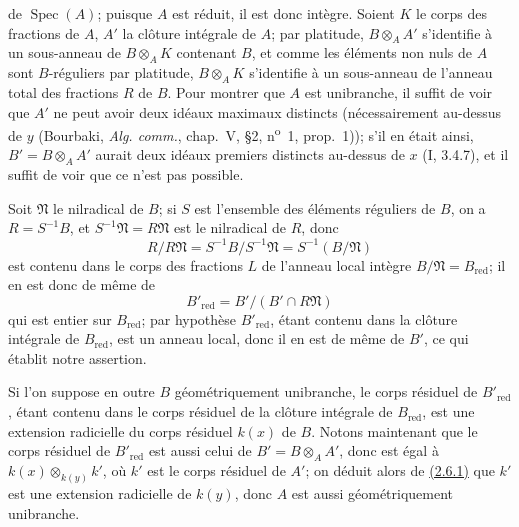 de $\operatorname{Spec}(A)$; puisque $A$ est réduit, il est donc
intègre. Soient $K$ le corps des fractions de $A$, $A'$ la clôture
intégrale de $A$; par platitude, $B\otimes_AA'$ s'identifie à un
sous-anneau de $B\otimes_AK$ contenant $B$, et comme les éléments non
nuls de $A$ sont $B$-réguliers par platitude, $B\otimes_AK$ s'identifie
à un sous-anneau de l'anneau total des fractions $R$ de $B$. Pour
montrer que $A$ est unibranche, il suffit de voir que $A'$ ne peut avoir
deux idéaux maximaux distincts (nécessairement au-dessus de $y$
(Bourbaki, \emph{Alg. comm.}, chap.~V, \S2,
n\textsuperscript{o}~1, prop.~1)); s'il en était ainsi,
$B'=B\otimes_AA'$ aurait deux idéaux premiers distincts au-dessus de
$x$ (I, 3.4.7), et il suffit de voir que ce n'est pas possible.

Soit $\mathfrak N$ le nilradical de $B$; si $S$ est l'ensemble des
éléments réguliers de $B$, on a $R=S^{-1}B$, et
$S^{-1}\mathfrak N=R\mathfrak N$ est le nilradical de $R$, donc
\[
 R/R\mathfrak N=S^{-1}B/S^{-1}\mathfrak N=S^{-1}(B/\mathfrak N)
\]
est contenu dans le corps des fractions $L$ de l'anneau local intègre
$B/\mathfrak N=B_{\mathrm{red}}$; il en est donc de même de
\[
 B'_{\mathrm{red}}=B'/(B'\cap R\mathfrak N)
\]
qui est entier sur $B_{\mathrm{red}}$; par hypothèse
$B'_{\mathrm{red}}$, étant contenu dans la clôture intégrale de
$B_{\mathrm{red}}$, est un anneau local, donc il en est de même de
$B'$, ce qui établit notre assertion.

Si l'on suppose en outre $B$ géométriquement unibranche, le corps
résiduel de $B'_{\mathrm{red}}$, étant contenu dans le corps résiduel de
la clôture intégrale de $B_{\mathrm{red}}$, est une extension radicielle
du corps résiduel $k(x)$ de $B$. Notons maintenant que le corps résiduel
de $B'_{\mathrm{red}}$ est aussi celui de $B'=B\otimes_AA'$, donc est
égal à $k(x)\otimes_{k(y)}k'$, où $k'$ est le corps résiduel de $A'$;
on déduit alors de {\hyperref[canon-index.ega4.c04.prop.2-6-1]{(2.6.1)}} que $k'$
est une extension radicielle de $k(y)$, donc $A$ est aussi
géométriquement unibranche.

